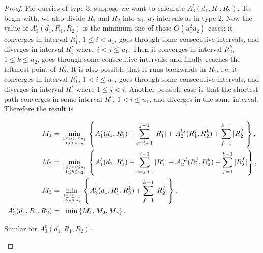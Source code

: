 \documentclass[11pt]{article}
\theoremstyle{plain}
\theoremstyle{definition}
\newcommand{\abs}[1]{\vert{#1}\vert}
\begin{document}
\begin{proof}
For queries of type 3, suppose we want to calculate $A_3^l(d_1,R_1,R_2).$ To begin with, we also divide $R_1$ and $R_2$ into $u_1,u_2$ intervals as in type 2. Now the value of $A_3^l(d_1,R_1,R_2)$ is the minimum one of these $O(u_1^2u_2)$ cases: it converges in interval $R_1^i$, $1\le i<u_1$, goes through some consecutive intervals, and diverges in interval $R_1^j$ where $i<j\le u_1.$ Then it converges in interval $R_2^k$, $1\le k\le u_2$, goes through some consecutive intervals, and finally reaches the leftmost point of $R_2^1.$ It is also possible that it runs backwards in $R_1$, i.e. it converges in interval $R_1^i$, $1< i \le u_1$, goes through some consecutive intervals, and diverges in interval $R_1^j$ where $1\le j<i.$ Another possible case is that the shortest path converges in some interval $R_1^i$, $1< i\le u_1$, and diverges in the same interval. Therefore the result is

\begin{equation}
\begin{split}
M_{1} &= \min_{{1\le i<j\le u_1 \atop 1\le k\le u_2}}\left\{A_1^r(d_1,R_1^i)+\sum_{e=i+1}^{j-1}\abs{R_1^e}+A_2^{l,l}(R_1^j,R_2^k)+\sum_{f=1}^{k-1}\abs{R_2^f}\right\},\\
M_{2} &= \min_{{1\le j<i\le u_1 \atop 1\le k\le u_2}}\left\{A_1^l(d_1,R_1^i)+\sum_{e=j+1}^{i-1}\abs{R_1^e}+A_2^{r,l}(R_1^j,R_2^k)+\sum_{f=1}^{k-1}\abs{R_2^f}\right\},\\
M_{3} &= \min_{{1\le i\le u_1 \atop 1\le k\le u_2}}\left\{A_3^l(d_1,R_1^i,R_2^k)+\sum_{f=1}^{k-1}\abs{R_2^f}\right\},\\
A_3^l(d_1,R_1,R_2) &= \;\; \min\left\{M_{1}, M_{2}, M_{3}\right\}.
\end{split}
\end{equation}

Similar for $A_3^r(d_1,R_1,R_2).$



\begin{center}

\begin{tikzpicture}[x=0.75pt,y=0.75pt,yscale=-1,xscale=1]



\end{tikzpicture}
\end{center}
\end{proof}
\end{document}
